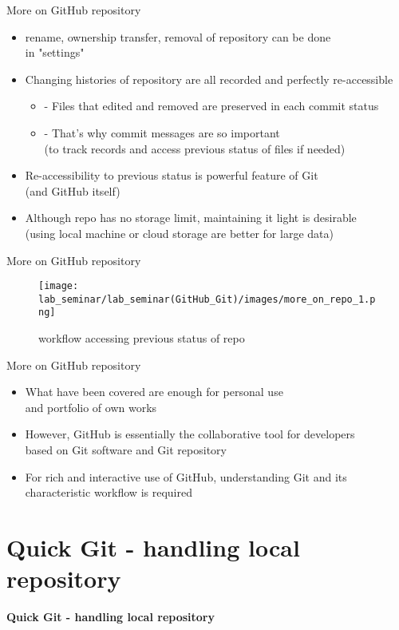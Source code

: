 \documentclass[11pt, xelatex]{beamer}
\newcommand{\bi}{\begin{itemize}}
\newcommand{\ei}{\end{itemize}}
\begin{document}
\begin{frame}{More on GitHub repository}
\bi
\item rename, ownership transfer, removal of repository can be done\\in "settings"
\item Changing histories of repository are all recorded and perfectly re-accessible
    \bi
    \item[-] Files that edited and removed are preserved in each commit status
    \item[-] That's why commit messages are so important\\
    (to track records and access previous status of files if needed)
    \ei
\item Re-accessibility to previous status is powerful feature of Git\\(and GitHub itself)
\item Although repo has no storage limit, maintaining it light is desirable
\\(using local machine or cloud storage are better for large data)
\ei
\end{frame}

\begin{frame}{More on GitHub repository}
\begin{figure}
	\texttt{[image: lab\_seminar/lab\_seminar(GitHub\_Git)/images/more\_on\_repo\_1.png]}
	\caption{workflow accessing previous status of repo}
\end{figure}
\end{frame}

\begin{frame}{More on GitHub repository}
\bi
\item What have been covered are enough for personal use\\and portfolio of own works
\item However, GitHub is essentially the collaborative tool for developers\\
based on Git software and Git repository
\item For rich and interactive use of GitHub, understanding Git and its characteristic workflow is required
\ei
\end{frame}




\section{Quick Git - handling local repository}
\begin{frame}
\Large
\centering
\textbf{Quick Git - handling local repository}
\end{frame}
\end{document}
